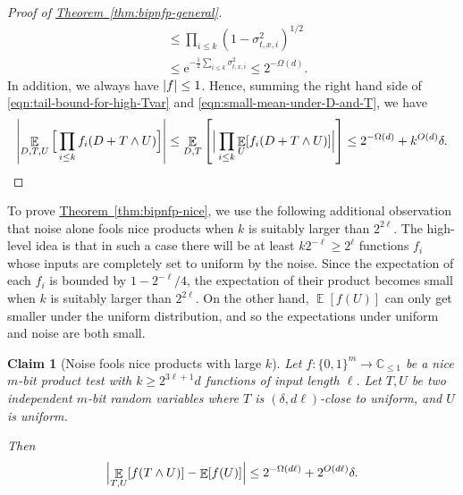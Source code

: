 \documentclass[11pt]{article}
\numberwithin{equation}{section}
\newtheorem{claim}[theorem]{Claim}
\theoremstyle{definition}
\theoremstyle{plain}
\newcommand{\C}{\mathbb C}
\newcommand{\eee}{\mathrm e}
\newcommand{\expref}[2]{\hyperref[#2]{#1~\ref{#2}}}
\newcommand{\zo}{\{0,1\}}
\def\Blocklength{\ell}
\DeclarePairedDelimiter{\abs}{\lvert}{\rvert}
\DeclareMathOperator*{\E}{\mathbb{E}}                 %
\begin{document}
\begin{proof}[Proof of {\expref{Theorem}{thm:bipnfp-general}}]
\begin{align}
      &\le \prod_{i \le k} (1 - \sigma_{t,x,i}^2)^{1/2} \nonumber \\
      &\le \eee^{-\frac{1}{2} \sum_{i \le k} \sigma_{t,x,i}^2} \le 2^{-\Omega(d)} .
    \end{align}
    In addition, we always have $\abs{f} \le 1$.
    Hence, summing the right hand side of \eqref{eqn:tail-bound-for-high-Tvar} and \eqref{eqn:small-mean-under-D-and-T}, we have
    \[
      \abs*{ \E_{D,T,U} \Big[ \prod_{i \le k} f_i(D + T \wedge U) \Big] }
      \le \E_{D,T} \left[ \Big| \prod_{i \le k} \E_U[f_i(D + T \wedge U)] \Big| \right]
      \le 2^{-\Omega(d)} + k^{O(d)} \delta . \qedhere
    \]
  \end{proof}

  To prove \expref{Theorem}{thm:bipnfp-nice}, we use the following
  additional observation that noise alone fools nice products when $k$ is suitably
	larger than $2^{2\Blocklength}$.
  The high-level idea is that in such a case there will be at least $k 2^{-\Blocklength} \ge 2^\Blocklength$ functions $f_i$ whose inputs are completely set to uniform by the noise. 
  Since the expectation of each $f_i$ is bounded by $1 - 2^{-\Blocklength}/4$, the expectation of their product becomes small when $k$ is suitably larger than $2^{2\Blocklength}$.
  On the other hand, $\E[f(U)]$ can only get smaller under the uniform distribution, and so the expectations under uniform and noise are both small.

  \begin{claim}[Noise fools nice products with large $k$] \label{claim-truncation}
Let $f\colon \zo^m \to \C_{\le 1}$ be a \emph{nice} 
 $m$-bit %
product test with $k \ge 2^{3\Blocklength+1} d$ functions of input length $\Blocklength$.
    Let $T,U$ be two independent $m$-bit random variables where $T$ is $(\delta, d\Blocklength)$-close to uniform, and $U$ is uniform.  
%

    Then
    \[
      \Bigl| \E_{T,U}[f(T \wedge U)] - \E[f(U)] \Bigr| \le 2^{-\Omega(d\Blocklength)} + 2^{O(d\Blocklength)} \delta .
    \]
  \end{claim}
\end{document}
